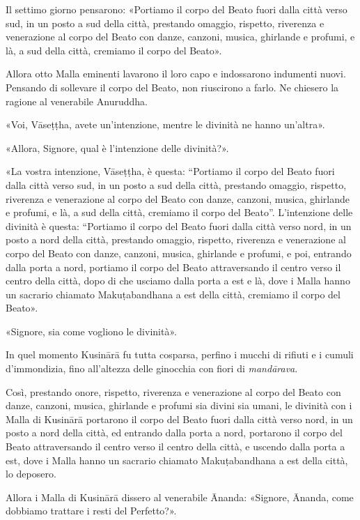 Il settimo giorno pensarono: «Portiamo il corpo del Beato fuori dalla
città verso sud, in un posto a sud della città, prestando omaggio,
rispetto, riverenza e venerazione al corpo del Beato con danze, canzoni,
musica, ghirlande e profumi, e là, a sud della città, cremiamo il corpo
del Beato».


Allora otto Malla eminenti lavarono il loro capo e indossarono indumenti
nuovi. Pensando di sollevare il corpo del Beato, non riuscirono a farlo.
Ne chiesero la ragione al venerabile Anuruddha.


«Voi, Vāseṭṭha, avete un’intenzione, mentre le divinità ne hanno
un’altra».


«Allora, Signore, qual è l’intenzione delle divinità?».


«La vostra intenzione, Vāseṭṭha, è questa: “Portiamo il corpo del Beato
fuori dalla città verso sud, in un posto a sud della città, prestando
omaggio, rispetto, riverenza e venerazione al corpo del Beato con danze,
canzoni, musica, ghirlande e profumi, e là, a sud della città, cremiamo
il corpo del Beato”. L’intenzione delle divinità è questa: “Portiamo il
corpo del Beato fuori dalla città verso nord, in un posto a nord della
città, prestando omaggio, rispetto, riverenza e venerazione al corpo del
Beato con danze, canzoni, musica, ghirlande e profumi, e poi, entrando
dalla porta a nord, portiamo il corpo del Beato attraversando il centro
verso il centro della città, dopo di che usciamo dalla porta a est e là,
dove i Malla hanno un sacrario chiamato Makuṭabandhana a est della
città, cremiamo il corpo del Beato».


«Signore, sia come vogliono le divinità».


In quel momento Kusinārā fu tutta cosparsa, perfino i mucchi di rifiuti
e i cumuli d’immondizia, fino all’altezza delle ginocchia con fiori di
\emph{mandārava}.


Così, prestando onore, rispetto, riverenza e venerazione al corpo del
Beato con danze, canzoni, musica, ghirlande e profumi sia divini sia
umani, le divinità con i Malla di Kusinārā portarono il corpo del Beato
fuori dalla città verso nord, in un posto a nord della città, ed
entrando dalla porta a nord, portarono il corpo del Beato attraversando
il centro verso il centro della città, e uscendo dalla porta a est, dove
i Malla hanno un sacrario chiamato Makuṭabandhana a est della città, lo
deposero.


Allora i Malla di Kusinārā dissero al venerabile Ānanda: «Signore,
Ānanda, come dobbiamo trattare i resti del Perfetto?».


